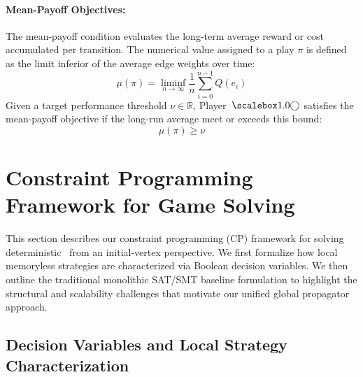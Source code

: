 \documentclass[a4paper,fleqn]{cas-sc}
\begin{document}
\paragraph{Mean-Payoff Objectives:}
The mean-payoff condition evaluates the long-term average reward or cost accumulated per transition. The numerical value assigned to a play $\pi$ is defined as the limit inferior of the average edge weights over time:
\[
\mu(\pi) = \liminf_{n \to \infty} \frac{1}{n} \sum_{i=0}^{n-1} Q(e_i)
\]
Given a target performance threshold $\nu \in \mathbb{R}$, Player~$\even$ satisfies the mean-payoff objective if the long-run average meet or exceeds this bound:
\[
\mu(\pi) \geq \nu
\]




\section{Constraint Programming Framework for Game Solving}
\label{sec:cp_framework}

This section describes our constraint programming (CP) framework for solving deterministic \wregulargames\ from an initial-vertex perspective. We first formalize how local memoryless strategies are characterized via Boolean decision variables. We then outline the traditional monolithic SAT/SMT baseline formulation to highlight the structural and scalability challenges that motivate our unified global propagator approach.


\subsection{Decision Variables and Local Strategy Characterization}
\label{sec:variables_local}
\end{document}
